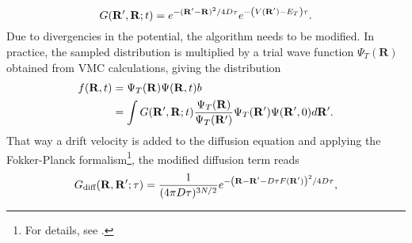 \[
G(\mathbf{R}',\mathbf{R};t) = e^{-(\mathbf{R}'-\mathbf{R})^2/4D\tau} e^{-\left( V(\mathbf{R}') - E_T \right) \tau}.
\]
Due to divergencies in the potential, the algorithm needs to be modified. In practice, the sampled distribution is multiplied by a trial wave function $\Psi_T(\mathbf{R})$ obtained from VMC calculations, giving the distribution 
\begin{align}
f(\mathbf{R},t) 
&= \Psi_T(\mathbf{R})\Psi(\mathbf{R},t)b \notag\\
&=
\int G(\mathbf{R}',\mathbf{R};t) \frac{\Psi_T(\mathbf{R})}{\Psi_T(\mathbf{R}')}\Psi_T(\mathbf{R}') \Psi(\mathbf{R}',0) d\mathbf{R}'.
\label{eq:DMCtrial}
\end{align}
That way a drift velocity is added to the diffusion equation and applying the Fokker-Planck formalism\footnote{For details, see \cite{hammond1994monte}.},  the modified diffusion term reads
\[
 G_{\text{diff}}(\mathbf{R},\mathbf{R}';\tau) = \frac{1}{(4\pi D\tau)^{3N/2}} e^{-\left( \mathbf{R}-\mathbf{R}'-D\tau F(\mathbf{R}')\right) ^2/4D\tau},
\]
